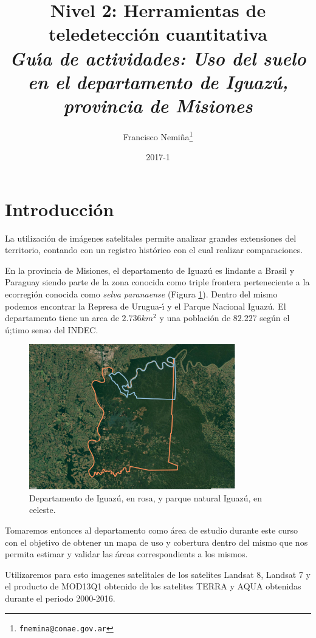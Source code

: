 \documentclass[a4paper]{book}
\title{{Nivel 2: Herramientas de teledetecci\'on cuantitativa}\\
\emph{Gu\'{\i}a de actividades: Uso del suelo en el departamento de Iguaz\'u,
provincia de Misiones}}
\date{2017-1}
\author{Francisco Nemiña\thanks{\texttt{fnemina@conae.gov.ar}}}
\affil{Unidad de Educacion y Formacion Masiva \\ Comisi\'on Nacional de Actividades Espaciales}
\begin{document}
\frontmatter
\maketitle

\tableofcontents
\mainmatter
\chapter*{Introducción}

\label{sec:intro}

La utilización de imágenes satelitales permite analizar grandes extensiones del
territorio, contando con un registro histórico con el cual realizar
comparaciones.

En la provincia de Misiones, el departamento de Iguaz\'u es lindante a Brasil y
Paraguay siendo parte de la zona conocida como triple frontera
perteneciente a la ecorregi\'on conocida como \emph{selva paranaense} (Figura \ref{parque}). Dentro
del mismo podemos encontrar la Represa de Urugua-\'{\i} y el Parque Nacional
Iguaz\'u. El departamento tiene un area de $2.736 km^2$ y una poblaci\'on de
$82.227$ seg\'un el \'u;timo senso del INDEC.

\begin{figure}[h!]
  \centering
  \includegraphics[width=0.8\textwidth]{triple.png}
  \caption{Departamento de Iguaz\'u, en rosa, y parque natural Iguaz\'u, en celeste.}
  \label{parque}
\end{figure}

Tomaremos entonces al departamento como \'area de estudio durante este curso
con el objetivo de obtener un mapa de uso y cobertura dentro del mismo que nos
permita estimar y validar  las \'areas correspondients a los mismos.

Utilizaremos para esto imagenes satelitales de los satelites Landsat 8, Landsat 7 y
el producto de MOD13Q1 obtenido de los satelites TERRA y AQUA obtenidas durante
el periodo 2000-2016.
\end{document}
